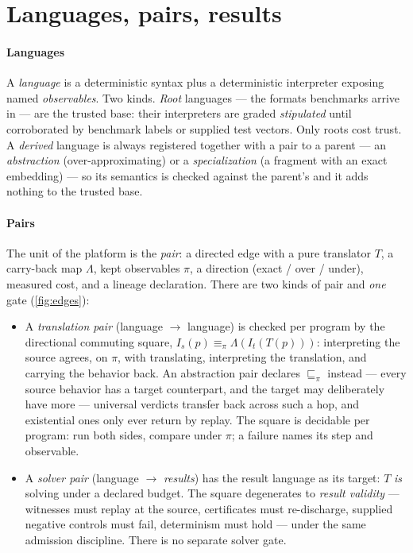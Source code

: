 
\section{Languages, pairs, results}
\label{sec:kernel}

\paragraph{Languages}
A \emph{language} is a deterministic syntax plus a deterministic
interpreter exposing named \emph{observables}. Two kinds. \emph{Root}
languages --- the formats benchmarks arrive in --- are the trusted
base: their interpreters are graded \emph{stipulated} until
corroborated by benchmark labels or supplied test vectors. Only roots
cost trust. A \emph{derived} language is always registered together
with a pair to a parent --- an \emph{abstraction}
(over-approximating) or a \emph{specialization} (a fragment with an
exact embedding) --- so its semantics is checked against the
parent's and it adds nothing to the trusted base.

\paragraph{Pairs}
The unit of the platform is the \emph{pair}: a directed edge with a
pure translator $T$, a carry-back map $\Lambda$, kept observables
$\pi$, a direction (exact / over / under), measured cost, and a
lineage declaration. There are two kinds of pair and \emph{one} gate
(\cref{fig:edges}):

\begin{itemize}
\item A \emph{translation pair} (language $\to$ language) is checked
  per program by the directional commuting square,
  $I_s(p) \equiv_\pi \Lambda(I_t(T(p)))$: interpreting the source
  agrees, on $\pi$, with translating, interpreting the translation,
  and carrying the behavior back. An abstraction pair declares
  $\sqsubseteq_\pi$ instead --- every source behavior has a target
  counterpart, and the target may deliberately have more ---
  universal verdicts transfer back across such a hop, and
  existential ones only ever return by replay. The square is
  decidable per program: run both sides, compare under $\pi$; a
  failure names its step and observable.
\item A \emph{solver pair} (language $\to$ \emph{results}) has the
  result language as its target: $T$ \emph{is} solving under a
  declared budget. The square degenerates to \emph{result validity}
  --- witnesses must replay at the source, certificates must
  re-discharge, supplied negative controls must fail, determinism
  must hold --- under the same admission discipline. There is no
  separate solver gate.
\end{itemize}

